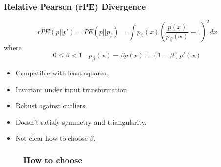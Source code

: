 \documentclass[slidestop,compress,mathserif]{beamer}
\begin{document}
	\begin{frame}
		\frametitle{Relative Pearson (rPE) Divergence}
		\begin{equation}
			rPE(p||p') = PE(p||p_\beta) = \int p_\beta(x)\left(\frac{p(x)}{p_\beta(x)}-1\right)^2dx
		\end{equation}
		where
		$$ 0\le\beta<1 \quad p_\beta(x) = \beta p(x) + (1-\beta)p'(x)  $$
		\begin{itemize}
			\item[\smiley]  Compatible with least-squares.
			\item[\smiley]  Invariant under input transformation.
			\item[\smiley]  Robust against outliers.
			\item[\frownie]  Doesn’t satisfy symmetry and triangularity.
			\item[\frownie]  Not clear how to choose $\beta$.
		\end{itemize}
	\end{frame}
	
	\begin{frame}
		\begin{figure}
			\frametitle{How to choose}
		\end{figure}
	\end{frame}
	
\end{document}
